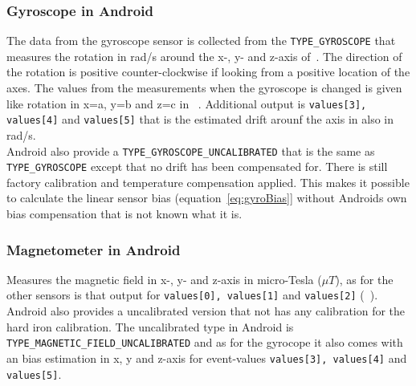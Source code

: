 \subsubsection{Gyroscope in Android}\label{subsec:gyroAndroid}
The data from the gyroscope sensor is collected from the \texttt{TYPE\_GYROSCOPE} that measures the rotation in rad/s around the x-, y- and z-axis of~. The direction of the rotation is positive counter-clockwise if looking from a positive location of the axes. The values from the measurements when the gyroscope is changed is given like rotation in x=a, y=b and z=c in ~. Additional output is \texttt{values[3], values[4]} and \texttt{values[5]} that is the estimated drift arounf the axis in also in rad/s.\\
Android also provide a \texttt{TYPE\_GYROSCOPE\_UNCALIBRATED} that is the same as \texttt{TYPE\_GYROSCOPE} except that no drift has been compensated for. There is still factory calibration and temperature compensation applied. \cite[]{android:sensorEvent} This makes it possible to calculate the linear sensor bias (equation~\ref{eq:gyroBias}] without Androids own bias compensation that is not known what it is.



\subsubsection{Magnetometer in Android}\label{subsec:magnAndroid}
Measures the magnetic field in x-, y- and z-axis in micro-Tesla ($\mu T$), as for the other sensors is that output for \texttt{values[0], values[1]} and \texttt{values[2]} (~). Android also provides a uncalibrated version that not has any calibration for the hard iron calibration. The uncalibrated type in Android is \texttt{TYPE\_MAGNETIC\_FIELD\_UNCALIBRATED} and as for the gyrocope it also comes with an bias estimation in x, y and z-axis for event-values \texttt{values[3], values[4]} and \texttt{values[5]}. 